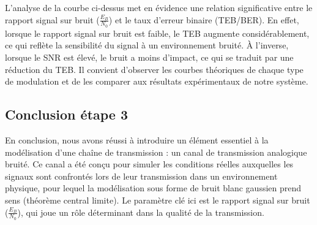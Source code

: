 L'analyse de la courbe ci-dessus met en évidence une relation significative entre le rapport signal sur bruit ($\frac{E_B}{N_0}$) et le taux d'erreur binaire (TEB/BER). En effet, lorsque le rapport signal sur bruit est faible, le TEB augmente considérablement, ce qui reflète la sensibilité du signal à un environnement bruité. À l'inverse, lorsque le SNR est élevé, le bruit a moins d'impact, ce qui se traduit par une réduction du TEB. Il convient d'observer les courbes théoriques de chaque type de modulation et de les comparer aux résultats expérimentaux de notre système.


\subsection{Conclusion étape 3}

En conclusion, nous avons réussi à introduire un élément essentiel à la modélisation d'une chaîne de transmission : un canal de transmission analogique bruité. Ce canal a été conçu pour simuler les conditions réelles auxquelles les signaux sont confrontés lors de leur transmission dans un environnement physique, pour lequel la modélisation sous forme de bruit blanc gaussien prend sens (théorème central limite). Le paramètre clé ici est le rapport signal sur bruit ($\frac{E_B}{N_0}$), qui joue un rôle déterminant dans la qualité de la transmission.